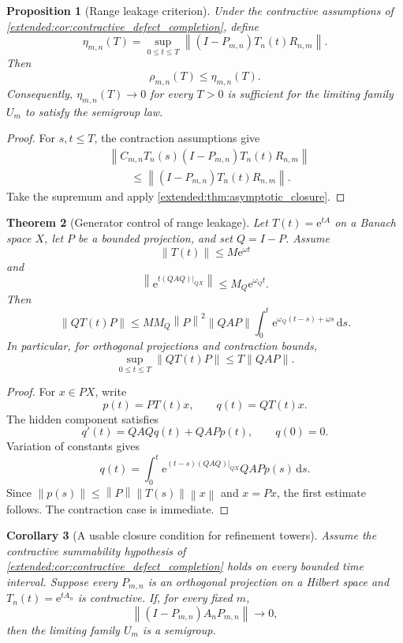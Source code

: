 \documentclass[11pt,a4paper]{article}
\newtheorem{theorem}{Theorem}[section]
\newtheorem{proposition}[theorem]{Proposition}
\newtheorem{corollary}[theorem]{Corollary}
\theoremstyle{definition}
\theoremstyle{remark}
\newcommand{\norm}[1]{\left\lVert#1\right\rVert}
\newcommand{\e}{\mathrm e}
\newcommand{\dd}{\,\mathrm d}
\begin{document}
\begin{proposition}[Range leakage criterion]\label{extended:record:025}\label{extended:prop:range_leakage}
Under the contractive assumptions of \cref{extended:cor:contractive_defect_completion}, define
\[
\eta_{m,n}(T)
=
\sup_{0\leq t\leq T}
\norm{(I-P_{m,n})T_n(t)R_{n,m}}.
\]
Then
\[
\rho_{m,n}(T)\leq\eta_{m,n}(T).
\]
Consequently, \(\eta_{m,n}(T)\to0\) for every \(T>0\) is sufficient for the limiting family \(U_m\) to satisfy the semigroup law.
\end{proposition}

\begin{proof}
For \(s,t\leq T\), the contraction assumptions give
\[
\begin{aligned}
&\norm{
C_{m,n}T_n(s)(I-P_{m,n})T_n(t)R_{n,m}
}\\
&\qquad\leq
\norm{(I-P_{m,n})T_n(t)R_{n,m}}.
\end{aligned}
\]
Take the supremum and apply \cref{extended:thm:asymptotic_closure}.
\end{proof}

\begin{theorem}[Generator control of range leakage]\label{extended:record:026}\label{extended:thm:generator_range_leakage}
Let \(T(t)=\e^{tA}\) on a Banach space \(X\), let \(P\) be a bounded projection, and set \(Q=I-P\). Assume
\[
\norm{T(t)}\leq M\e^{\omega t}
\]
and
\[
\norm{\e^{t(QAQ)|_{QX}}}
\leq M_Q\e^{\omega_Qt}.
\]
Then
\[
\norm{QT(t)P}
\leq
M M_Q\norm P^2\norm{QAP}
\int_0^t
\e^{\omega_Q(t-s)+\omega s}
\dd s.
\]
In particular, for orthogonal projections and contraction bounds,
\[
\sup_{0\leq t\leq T}
\norm{QT(t)P}
\leq
T\norm{QAP}.
\]
\end{theorem}

\begin{proof}
For \(x\in PX\), write
\[
p(t)=PT(t)x,
\qquad
q(t)=QT(t)x.
\]
The hidden component satisfies
\[
q'(t)=QAQq(t)+QAPp(t),
\qquad
q(0)=0.
\]
Variation of constants gives
\[
q(t)=
\int_0^t
\e^{(t-s)(QAQ)|_{QX}}
QAPp(s)
\dd s.
\]
Since
\(
\norm{p(s)}\leq\norm P\norm{T(s)}\norm x
\)
and \(x=Px\), the first estimate follows. The contraction case is immediate.
\end{proof}

\begin{corollary}[A usable closure condition for refinement towers]\label{extended:record:027}\label{extended:cor:generator_closure_tower}
Assume the contractive summability hypothesis of \cref{extended:cor:contractive_defect_completion} holds on every bounded time interval. Suppose every \(P_{m,n}\) is an orthogonal projection on a Hilbert space and \(T_n(t)=\e^{tA_n}\) is contractive. If, for every fixed \(m\),
\[
\norm{(I-P_{m,n})A_nP_{m,n}}
\longrightarrow0,
\]
then the limiting family \(U_m\) is a semigroup.
\end{corollary}
\end{document}
